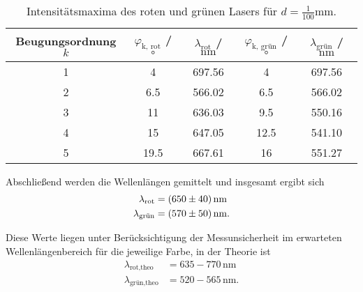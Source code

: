 \begin{table} [H]
  \centering
  \caption{Intensitätsmaxima des roten und grünen Lasers für $d=\frac{1}{100}\unit{\milli\meter}$.}
  \label{tab:100mm}
  \begin{tabular}{S S S S S}
    \toprule
  {Beugungsordnung $k$} & {$\varphi_{\text{k, rot}}$ / $\unit{\degree}$} & {$\lambda_{\text{rot}}$ / $\unit{\nano\meter}$}  & {$\varphi_{\text{k, grün}}$ / $\unit{\degree}$} & {$\lambda_{\text{grün}}$ / $\unit{\nano\meter}$} \\
     & 4 & 697.56 & 4 & 697.56 \\
    2 & 6.5 & 566.02 & 6.5 & 566.02 \\
    3 & 11 & 636.03 & 9.5 & 550.16 \\
    4 & 15 & 647.05 & 12.5 & 541.10 \\
    5 & 19.5 & 667.61 & 16 & 551.27 \\
    \bottomrule
  \end{tabular}
\end{table}

Abschließend werden die Wellenlängen gemittelt und insgesamt ergibt sich
\begin{align*}
  \lambda_{\text{rot}}&=\qty{650+-40}{\nano\meter} \\
  \lambda_{\text{grün}}&=\qty{570+-50}{\nano\meter}.
\end{align*}

Diese Werte liegen unter Berücksichtigung der Messunsicherheit im erwarteten Wellenlängenbereich für
die jeweilige Farbe, in der Theorie \cite{Lichtfarben} ist
\begin{align*}
  \lambda_{\text{rot,theo}}&=635-770\,\unit{\nano\meter} \\
  \lambda_{\text{grün,theo}}&=520-565\,\unit{\nano\meter}.
\end{align*}